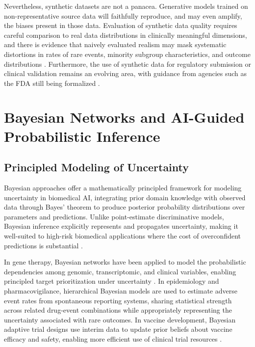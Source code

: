 Nevertheless, synthetic datasets are not a panacea. Generative models trained on non-representative source data will faithfully reproduce, and may even amplify, the biases present in those data. Evaluation of synthetic data quality requires careful comparison to real data distributions in clinically meaningful dimensions, and there is evidence that naively evaluated realism may mask systematic distortions in rates of rare events, minority subgroup characteristics, and outcome distributions \parencite{walonoski2018}. Furthermore, the use of synthetic data for regulatory submission or clinical validation remains an evolving area, with guidance from agencies such as the FDA still being formalized \parencite{fda2023}.

\section{Bayesian Networks and AI-Guided Probabilistic Inference}

\subsection{Principled Modeling of Uncertainty}

Bayesian approaches offer a mathematically principled framework for modeling uncertainty in biomedical AI, integrating prior domain knowledge with observed data through Bayes' theorem to produce posterior probability distributions over parameters and predictions. Unlike point-estimate discriminative models, Bayesian inference explicitly represents and propagates uncertainty, making it well-suited to high-risk biomedical applications where the cost of overconfident predictions is substantial \parencite{ghahramani2015}.

In gene therapy, Bayesian networks have been applied to model the probabilistic dependencies among genomic, transcriptomic, and clinical variables, enabling principled target prioritization under uncertainty \parencite{danaeifar2025}. In epidemiology and pharmacovigilance, hierarchical Bayesian models are used to estimate adverse event rates from spontaneous reporting systems, sharing statistical strength across related drug-event combinations while appropriately representing the uncertainty associated with rare outcomes. In vaccine development, Bayesian adaptive trial designs use interim data to update prior beliefs about vaccine efficacy and safety, enabling more efficient use of clinical trial resources \parencite{berry2010}.

